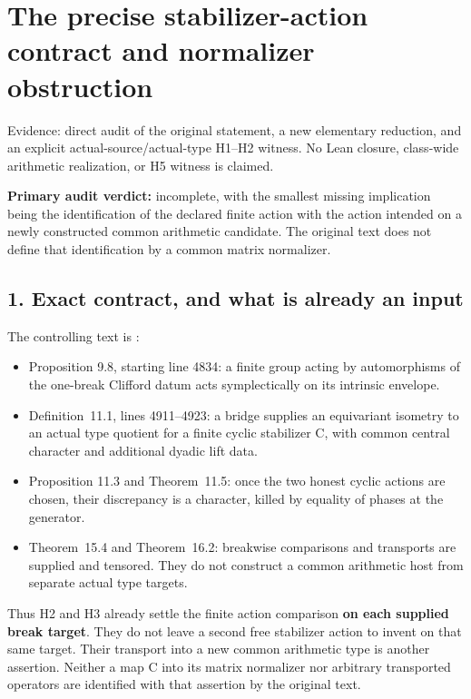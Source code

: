 \clearpage
\section{The precise stabilizer-action contract and normalizer obstruction}\label{app:stabilizer_contract}

Evidence: direct audit of the original statement, a new elementary
reduction, and an explicit actual-source/actual-type H1--H2 witness.
No Lean closure, class-wide arithmetic
realization, or H5 witness is claimed.

\textbf{Primary audit verdict:} incomplete, with the smallest missing
implication being the identification of the declared finite action with
the action intended on a newly constructed common arithmetic candidate.
The original text does not define that identification by a common matrix
normalizer.

\hypertarget{stabilizer_contract-exact-contract-and-what-is-already-an-input}{%
\subsection{1. Exact contract, and what is already an
input}\label{stabilizer_contract-exact-contract-and-what-is-already-an-input}}

The controlling text is
:

\begin{itemize}
\tightlist
\item
  Proposition 9.8, starting line 4834: a finite group acting by
  automorphisms of the one-break Clifford datum acts symplectically on
  its intrinsic envelope.
\item
  Definition~11.1, lines 4911--4923: a bridge supplies an equivariant
  isometry to an actual type quotient for a finite cyclic stabilizer C,
  with common central character and additional dyadic lift data.
\item
  Proposition 11.3 and Theorem~11.5: once the two honest cyclic actions
  are chosen, their discrepancy is a character, killed by equality of phases at the generator.
\item
  Theorem~15.4 and Theorem~16.2: breakwise comparisons and transports are
  supplied and tensored. They do not construct a common arithmetic host
  from separate actual type targets.
\end{itemize}

Thus H2 and H3 already settle the finite action comparison \textbf{on
each supplied break target}. They do not leave a second free stabilizer
action to invent on that same target. Their transport into a new common
arithmetic type is another assertion. Neither a map C into its matrix
normalizer nor arbitrary transported operators are identified with that
assertion by the original text.

